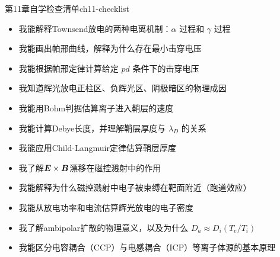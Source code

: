 \begin{checklistbox}{第11章自学检查清单}{ch11-checklist}
\begin{itemize}[leftmargin=*,label=$\square$]
\item[$\square$] 我能解释Townsend放电的两种电离机制：$\alpha$ 过程和 $\gamma$ 过程
\item[$\square$] 我能画出帕邢曲线，解释为什么存在最小击穿电压
\item[$\square$] 我能根据帕邢定律计算给定 $pd$ 条件下的击穿电压
\item[$\square$] 我知道辉光放电正柱区、负辉光区、阴极暗区的物理成因
\item[$\square$] 我能用Bohm判据估算离子进入鞘层的速度
\item[$\square$] 我能计算Debye长度，并理解鞘层厚度与 $\lambda_D$ 的关系
\item[$\square$] 我能应用Child-Langmuir定律估算鞘层厚度
\item[$\square$] 我了解$\bm{E}\times\bm{B}$漂移在磁控溅射中的作用
\item[$\square$] 我能解释为什么磁控溅射中电子被束缚在靶面附近（跑道效应）
\item[$\square$] 我能从放电功率和电流估算辉光放电的电子密度
\item[$\square$] 我了解ambipolar扩散的物理意义，以及为什么 $D_a \approx D_i(T_e/T_i)$
\item[$\square$] 我能区分电容耦合（CCP）与电感耦合（ICP）等离子体源的基本原理
\end{itemize}
\end{checklistbox}

\endinput
